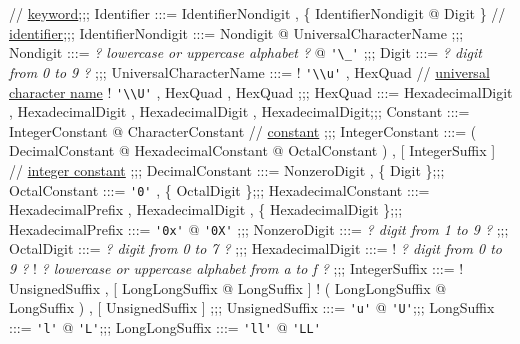 {\begin{bnf}[colspec={Q[0mm]Q[r,font=\sffamily]Q[r]Q[l,mode=text,font=\ttfamily,92mm]Q[l]}]
// \hyperref[subsec:keywords]{keyword};;;
Identifier :::=
{\sffamily IdentifierNondigit} , \{ {\sffamily IdentifierNondigit} @ {\sffamily Digit} \}
// \hyperref[subsec:identifiers]{identifier};;;
IdentifierNondigit :::= {\sffamily Nondigit} @ {\sffamily UniversalCharacterName}
;;;
Nondigit :::=
{\it ? lowercase or uppercase alphabet ?} @ \lstinline{'\_'}
;;;
Digit :::=
{\it ? digit from 0 to 9 ?}
;;;
UniversalCharacterName :::=
! \lstinline{'\\u'} , {\sffamily HexQuad}
// \hyperref[subsec:univnames]{universal character name}
! \lstinline{'\\U'} , {\sffamily HexQuad} , {\sffamily HexQuad}
;;;
HexQuad :::=
{\sffamily HexadecimalDigit} , {\sffamily HexadecimalDigit} , {\sffamily HexadecimalDigit} , {\sffamily HexadecimalDigit};;;
Constant :::=
{\sffamily IntegerConstant} @ {\sffamily CharacterConstant}
// \hyperref[subsec:constants]{constant}
;;;
IntegerConstant :::=
( {\sffamily DecimalConstant} @ {\sffamily HexadecimalConstant} @ {\sffamily OctalConstant} ) , [ {\sffamily IntegerSuffix} ]
// \hyperref[subsubsec:intconstants]{integer constant}
;;;
DecimalConstant :::=
{\sffamily NonzeroDigit} , \{ {\sffamily Digit} \};;;
OctalConstant :::=
\lstinline{'0'} , \{ {\sffamily OctalDigit} \};;;
HexadecimalConstant :::=
{\sffamily HexadecimalPrefix} , {\sffamily HexadecimalDigit} , \newline
\{ {\sffamily HexadecimalDigit} \};;;
HexadecimalPrefix :::=
\lstinline{'0x'} @ \lstinline{'0X'}
;;;
NonzeroDigit :::=
{\it ? digit from 1 to 9 ?}
;;;
OctalDigit :::=
{\it ? digit from 0 to 7 ?}
;;;
HexadecimalDigit :::=
! {\it ? digit from 0 to 9 ?}
! {\it ? lowercase or uppercase alphabet from a to f ?}
;;;
IntegerSuffix :::=
! {\sffamily UnsignedSuffix} , [ {\sffamily LongLongSuffix} @ {\sffamily LongSuffix} ]
! ( {\sffamily LongLongSuffix} @ {\sffamily LongSuffix} ) , [ {\sffamily UnsignedSuffix} ]
;;;
UnsignedSuffix :::=
\lstinline{'u'} @ \lstinline{'U'};;;
LongSuffix :::=
\lstinline{'l'} @ \lstinline{'L'};;;
LongLongSuffix :::=
\lstinline{'ll'} @ \lstinline{'LL'}
\end{bnf}
}

